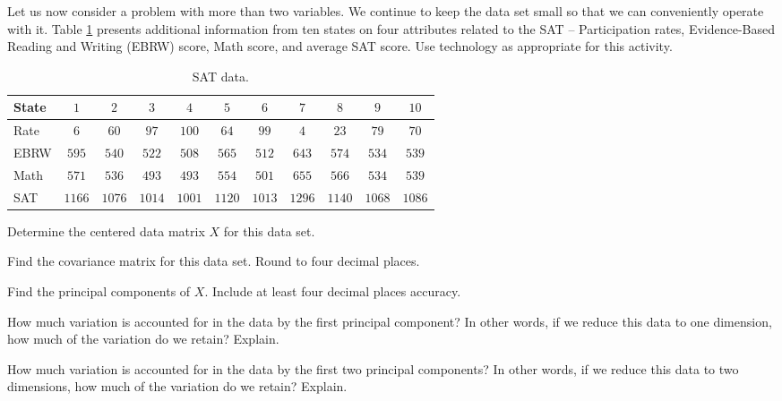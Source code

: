 \begin{pactivity} \label{act:PCA_4D_SAT} Let us now consider a problem with more than two variables. We continue to keep the data set small so that we can conveniently operate with it. Table \ref{T:PCA_SAT} presents additional information from ten states on four attributes related to the SAT -- Participation rates, Evidence-Based Reading and Writing (EBRW) score, Math score, and average SAT score. Use technology as appropriate for this activity. 
\begin{table}[ht]
\begin{center}
\setlength{\tabcolsep}{3pt}
\begin{tabular}{lcccccccccc} 
State			&$1$	 &$2$ &$3$ &$4$ &$5$ &$6$ &$7$ &$8$ &$9$ &$10$ \\ \hline
Rate 	&$6$ &$60$ &$97$ &$100$ &$64$ &$99$ &$4$ &$23$ &$79$ &$70$ \\ 
EBRW		&$595$ &$540$ &$522$ &$508$ &$565$ &$512$ &$643$ &$574$ &$534$ &$539$ \\
Math			&$571$ &$536$ &$493$ &$493$ &$554$ &$501$ &$655$ &$566$ &$534$ &$539$ \\
SAT			&$1166$ &$1076$ &$1014$ &$1001$ &$1120$ &$1013$ &$1296$ &$1140$ &$1068$ &$1086$ 
\end{tabular}
\caption{SAT data.}
\label{T:PCA_SAT}
\end{center}
\end{table}
\ba
\item Determine the centered data matrix $X$ for this data set.


\item Find the covariance matrix for this data set. Round to four decimal places. 


\item Find the principal components of $X$. Include at least four decimal places accuracy. 

\item How much variation is accounted for in the data by the first principal component? In other words, if we reduce this data to one dimension, how much of the variation do we retain? Explain.

\item How much variation is accounted for in the data by the first two principal components? In other words, if we reduce this data to two dimensions, how much of the variation do we retain? Explain.


\ea

\end{pactivity}

